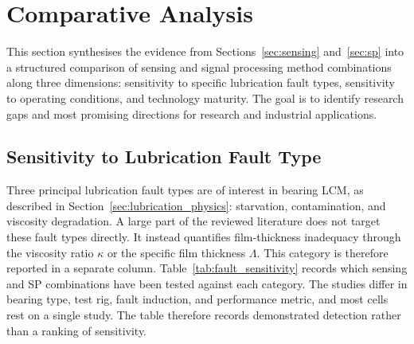 \section{Comparative Analysis}
\label{sec:comparative}

This section synthesises the evidence from Sections~\ref{sec:sensing} and~\ref{sec:sp} into a structured comparison of sensing and signal processing method combinations along three dimensions: sensitivity to specific lubrication fault types, sensitivity to operating conditions, and technology maturity. The goal is to identify research gaps and most promising directions for research and industrial applications.

\subsection{Sensitivity to Lubrication Fault Type}
\label{subsec:comp_fault}

Three principal lubrication fault types are of interest in bearing LCM, as described in Section~\ref{sec:lubrication_physics}: starvation, contamination, and viscosity degradation. A large part of the reviewed literature does not target these fault types directly. It instead quantifies film-thickness inadequacy through the viscosity ratio $\kappa$ or the specific film thickness $\Lambda$. This category is therefore reported in a separate column. Table~\ref{tab:fault_sensitivity} records which sensing and SP combinations have been tested against each category. The studies differ in bearing type, test rig, fault induction, and performance metric, and most cells rest on a single study. The table therefore records demonstrated detection rather than a ranking of sensitivity.

